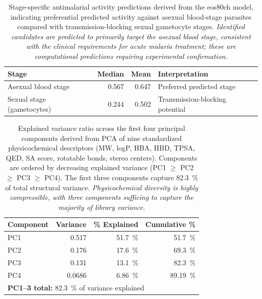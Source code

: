 \documentclass[journal=jcisd8,manuscript=suppinfo]{achemso}
\begin{document}
\begin{table}[!htbp]
\centering
\caption{Stage-specific antimalarial activity predictions derived from the eos80ch model, indicating preferential predicted activity against asexual blood-stage parasites compared with transmission-blocking sexual gametocyte stages. \textit{Identified candidates are predicted to primarily target the asexual blood stage, consistent with the clinical requirements for acute malaria treatment; these are computational predictions requiring experimental confirmation.}}
\label{tab:stage_activity}
\begin{tabular}{@{}l r r l@{}}
\toprule
\textbf{Stage} & \textbf{Median} & \textbf{Mean} & \textbf{Interpretation} \\
\midrule
Asexual blood stage & \num{0.567} & \num{0.647} & Preferred predicted stage \\
Sexual stage (gametocytes) & \num{0.244} & \num{0.502} & Transmission-blocking potential \\
\bottomrule
\end{tabular}
\end{table}

\begin{table}[!htbp]
\centering
\caption{Explained variance ratio across the first four principal components derived from PCA of nine standardized physicochemical descriptors (MW, logP, HBA, HBD, TPSA, QED, SA score, rotatable bonds, stereo centers). Components are ordered by decreasing explained variance (PC1 $\geq$ PC2 $\geq$ PC3 $\geq$ PC4). The first three components capture \qty{82.3}{\percent} of total structural variance. \textit{Physicochemical diversity is highly compressible, with three components sufficing to capture the majority of library variance.}}
\label{tab:pca}
\begin{tabular}{@{}l r r r@{}}
\toprule
\textbf{Component} & \textbf{Variance} & \textbf{\unit{\percent} Explained} & \textbf{Cumulative \unit{\percent}} \\
\midrule
PC1 & \num{0.517} & \qty{51.7}{\percent} & \qty{51.7}{\percent} \\
PC2 & \num{0.176} & \qty{17.6}{\percent} & \qty{69.3}{\percent} \\
PC3 & \num{0.131} & \qty{13.1}{\percent} & \qty{82.3}{\percent} \\
PC4 & \num{0.0686} & \qty{6.86}{\percent} & \qty{89.19}{\percent} \\
\midrule
\multicolumn{4}{l}{\textbf{PC1--3 total:} \qty{82.3}{\percent} of variance explained} \\
\bottomrule
\end{tabular}
\end{table}
\end{document}
